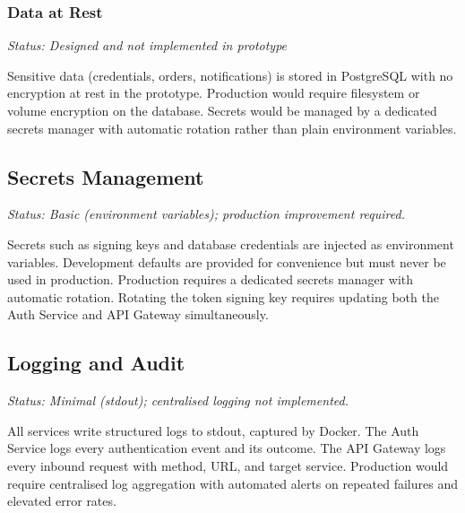 \subsubsection{Data at Rest}

\textit{Status: Designed and not implemented in prototype}

Sensitive data (credentials, orders, notifications) is stored in PostgreSQL with no encryption at rest in the prototype. Production would require filesystem or volume encryption on the database. Secrets would be managed by a dedicated secrets manager with automatic rotation rather than plain environment variables.

\subsection{Secrets Management}
\label{subsec:secrets}

\textit{Status: Basic (environment variables); production improvement required.}

Secrets such as signing keys and database credentials are injected as environment variables. Development defaults are provided for convenience but must never be used in production. Production requires a dedicated secrets manager with automatic rotation. Rotating the token signing key requires updating both the Auth Service and API Gateway simultaneously.

\subsection{Logging and Audit}
\label{subsec:security_monitoring}

\textit{Status: Minimal (stdout); centralised logging not implemented.}

All services write structured logs to stdout, captured by Docker. The Auth Service logs every authentication event and its outcome. The API Gateway logs every inbound request with method, URL, and target service. Production would require centralised log aggregation with automated alerts on repeated failures and elevated error rates.

